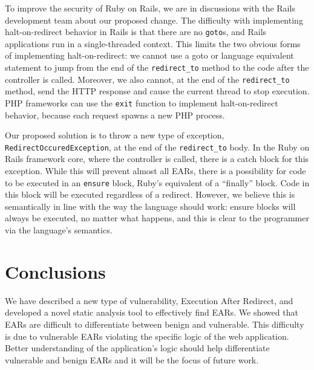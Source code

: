 To improve the security of Ruby on Rails, we are in discussions with the
Rails development team about our proposed change. The difficulty with
implementing halt-on-redirect behavior in Rails is that there are no
\texttt{goto}s, and Rails applications run in a single-threaded context.
This limits the two obvious forms of implementing halt-on-redirect: we
cannot use a go\-to or language equivalent statement to jump from the end
of the \texttt{redirect\_to} method to the code after the controller is
called. Moreover, we also cannot, at the end of the \texttt{redirect\_to}
method, send the HTTP response and cause the current thread to stop
execution. PHP frameworks can use the \texttt{exit} function to implement
halt-on-redirect behavior, because each request spawns a new PHP process.

Our proposed solution is to throw a new type of exception,
\texttt{RedirectOccuredException}, at the end of the
\texttt{redirect\_to} body. In the Ruby on Rails framework core, where
the controller is called, there is a catch block for this exception.
While this will prevent almost all EARs, there is a possibility for
code to be executed in an \texttt{ensure} block, Ruby's equivalent of
a ``finally'' block. Code in this block will be executed regardless of a
redirect. However, we believe this is semantically in line with the
way the language should work: ensure blocks will always be executed,
no matter what happens, and this is clear to the programmer via the
language's semantics.


\section{Conclusions}

We have described a new type of vulnerability, Execution After Redirect,
and developed a novel static analysis tool to effectively find EARs. We
showed that EARs are difficult to differentiate between benign and
vulnerable. This difficulty is due to vulnerable EARs violating the
specific logic of the web application. Better understanding of the
application's logic should help differentiate vulnerable and benign EARs
and it will be the focus of future work.



